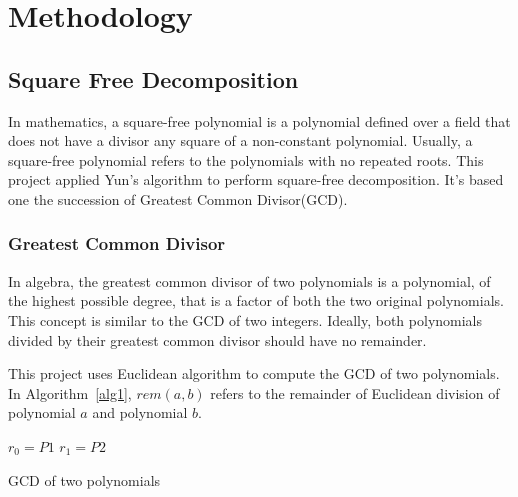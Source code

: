 \section{Methodology} \label{methods}


\subsection{Square Free Decomposition} 
In mathematics, a square-free polynomial is a polynomial defined over a field
that does not have a divisor any square of a non-constant
polynomial\cite{Yuns}. Usually, a square-free polynomial refers to the
polynomials with no repeated roots. This project applied Yun's
algorithm to perform square-free decomposition. It's based one the
succession of Greatest Common Divisor(GCD).

\subsubsection{Greatest Common Divisor}

In algebra, the greatest common divisor of two polynomials is a polynomial, 
of the highest possible degree, that is a factor of both the two original
polynomials. This concept is similar to the GCD of two integers. Ideally, both
polynomials divided by their greatest common divisor should have no remainder.

This project uses Euclidean algorithm to compute the GCD of two polynomials.
In Algorithm~\ref{alg1}, $rem(a,b)$ refers to the remainder of Euclidean division of
polynomial $a$ and polynomial $b$.

\begin{algorithm}[H]
\label{alg1}
\SetAlgoLined


  $r_0 = P1$\;
  $r_1 = P2$\;


\caption{GCD of two polynomials}
\end{algorithm}

